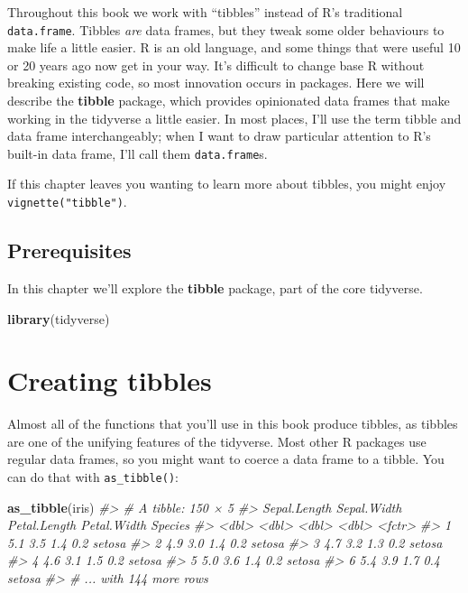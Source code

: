 \documentclass[]{book}
\newenvironment{Shaded}{\begin{snugshade}}{\end{snugshade}}
\newcommand{\KeywordTok}[1]{\textcolor[rgb]{0.13,0.29,0.53}{\textbf{{#1}}}}
\newcommand{\CommentTok}[1]{\textcolor[rgb]{0.56,0.35,0.01}{\textit{{#1}}}}
\newcommand{\NormalTok}[1]{{#1}}
\begin{document}
Throughout this book we work with ``tibbles'' instead of R's traditional
\texttt{data.frame}. Tibbles \emph{are} data frames, but they tweak some
older behaviours to make life a little easier. R is an old language, and
some things that were useful 10 or 20 years ago now get in your way.
It's difficult to change base R without breaking existing code, so most
innovation occurs in packages. Here we will describe the \textbf{tibble}
package, which provides opinionated data frames that make working in the
tidyverse a little easier. In most places, I'll use the term tibble and
data frame interchangeably; when I want to draw particular attention to
R's built-in data frame, I'll call them \texttt{data.frame}s.

If this chapter leaves you wanting to learn more about tibbles, you
might enjoy \texttt{vignette("tibble")}.

\subsection{Prerequisites}\label{prerequisites-4}

In this chapter we'll explore the \textbf{tibble} package, part of the
core tidyverse.

\begin{Shaded}
\begin{Highlighting}[]
\KeywordTok{library}\NormalTok{(tidyverse)}
\end{Highlighting}
\end{Shaded}

\section{Creating tibbles}\label{tibbles}

Almost all of the functions that you'll use in this book produce
tibbles, as tibbles are one of the unifying features of the tidyverse.
Most other R packages use regular data frames, so you might want to
coerce a data frame to a tibble. You can do that with
\texttt{as\_tibble()}:

\begin{Shaded}
\begin{Highlighting}[]
\KeywordTok{as_tibble}\NormalTok{(iris)}
\CommentTok{#> # A tibble: 150 × 5}
\CommentTok{#>   Sepal.Length Sepal.Width Petal.Length Petal.Width Species}
\CommentTok{#>          <dbl>       <dbl>        <dbl>       <dbl>  <fctr>}
\CommentTok{#> 1          5.1         3.5          1.4         0.2  setosa}
\CommentTok{#> 2          4.9         3.0          1.4         0.2  setosa}
\CommentTok{#> 3          4.7         3.2          1.3         0.2  setosa}
\CommentTok{#> 4          4.6         3.1          1.5         0.2  setosa}
\CommentTok{#> 5          5.0         3.6          1.4         0.2  setosa}
\CommentTok{#> 6          5.4         3.9          1.7         0.4  setosa}
\CommentTok{#> # ... with 144 more rows}
\end{Highlighting}
\end{Shaded}
\end{document}
